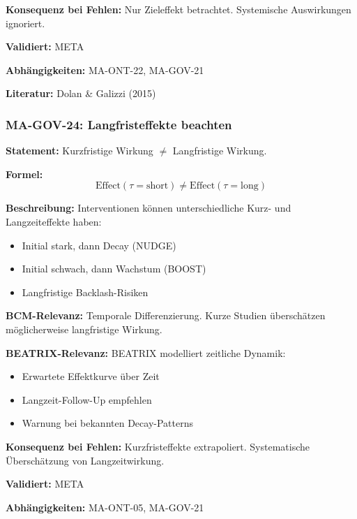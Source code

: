 \textbf{Konsequenz bei Fehlen:}
Nur Zieleffekt betrachtet. Systemische Auswirkungen ignoriert.

\textbf{Validiert:} META

\textbf{Abhängigkeiten:} MA-ONT-22, MA-GOV-21

\textbf{Literatur:} Dolan \& Galizzi (2015)


\subsubsection*{MA-GOV-24: Langfristeffekte beachten}

\textbf{Statement:} Kurzfristige Wirkung $\neq$ Langfristige Wirkung.

\textbf{Formel:}
\begin{equation}
\text{Effect}(\tau = \text{short}) \neq \text{Effect}(\tau = \text{long})
\end{equation}

\textbf{Beschreibung:}
Interventionen können unterschiedliche Kurz- und Langzeiteffekte haben:
\begin{itemize}
    \item Initial stark, dann Decay (NUDGE)
    \item Initial schwach, dann Wachstum (BOOST)
    \item Langfristige Backlash-Risiken
\end{itemize}

\textbf{BCM-Relevanz:}
Temporale Differenzierung. Kurze Studien überschätzen möglicherweise langfristige Wirkung.

\textbf{BEATRIX-Relevanz:}
BEATRIX modelliert zeitliche Dynamik:
\begin{itemize}
    \item Erwartete Effektkurve über Zeit
    \item Langzeit-Follow-Up empfehlen
    \item Warnung bei bekannten Decay-Patterns
\end{itemize}

\textbf{Konsequenz bei Fehlen:}
Kurzfristeffekte extrapoliert. Systematische Überschätzung von Langzeitwirkung.

\textbf{Validiert:} META

\textbf{Abhängigkeiten:} MA-ONT-05, MA-GOV-21

